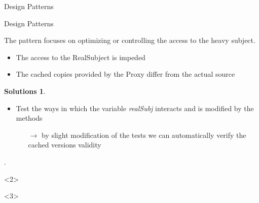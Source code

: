\documentclass{beamer}
\theoremstyle{definition}
\newtheorem{Solutions}{Solutions}
\begin{document}
\begin{section}{Design Patterns}
\begin{subsection}{Design Patterns}
\begin{frame}
{		The pattern focuses on optimizing or controlling the access to the heavy subject.  
		\begin{itemize}
			\item The access to the RealSubject is impeded
			\item The cached copies provided by the Proxy differ from the actual source
		\end{itemize}
		\vspace{3mm}
\begin{Solutions}
	\begin{itemize}
	\item	Test the ways in which the variable \textit{realSubj} interacts and is modified by the methods \begin{itemize}
		\item[$ \rightarrow $] by slight modification of the tests we can automatically verify the cached versions validity
	\end{itemize}
	\end{itemize}
\end{Solutions}.}<2> 
		

		
	\end{frame}
\end{subsection}


\end{section}
\end{document}
